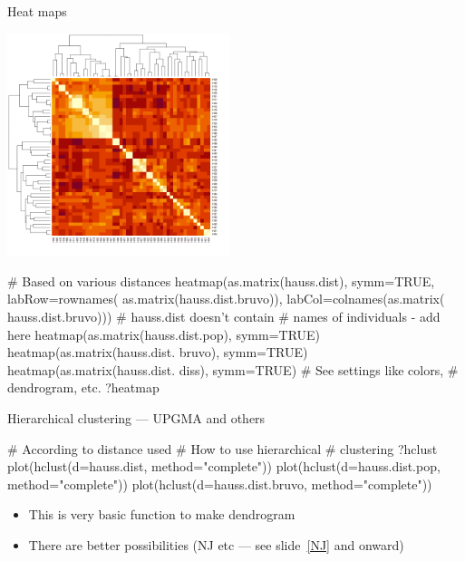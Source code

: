 \documentclass[compress, xelatex, 11pt, xcolor=svgnames, aspectratio=169,
	hyperref={
		bookmarks=true,
		unicode=true,
		colorlinks=true,
		pdftitle={Molecular data in R},
		plainpages=false,
		pdfauthor={Vojtech Zeisek},
		pdfsubject={Course about phylogeny and evolution in R},
		pdfcreator={XeLaTeX},
		pdfkeywords={R, evolution, phylogeny, molecular data},
		linkcolor=Crimson, %
		anchorcolor=Magenta, %
		citecolor=Magenta, %
		filecolor=Magenta, %
		menucolor=Magenta, %
		urlcolor=DodgerBlue, %
		},
	url={hyphens, lowtilde} %
	]{beamer}
\renewcommand{\texttt}[1]{\colorbox{Beige}{{\ttfamily #1}}}
\begin{document}
\begin{frame}[fragile]{Heat maps}
	\label{hierclust}
	\begin{multicols}{2}
		\includegraphics[height=6.5cm]{heatmap.png}
		\columnbreak
		\begin{spluscode}
    # Based on various distances
    heatmap(as.matrix(hauss.dist),
      symm=TRUE, labRow=rownames(
      as.matrix(hauss.dist.bruvo)),
      labCol=colnames(as.matrix(
      hauss.dist.bruvo)))
      # hauss.dist doesn't contain
      # names of individuals - add here
    heatmap(as.matrix(hauss.dist.pop),
      symm=TRUE)
    heatmap(as.matrix(hauss.dist.
      bruvo), symm=TRUE)
    heatmap(as.matrix(hauss.dist.
      diss), symm=TRUE)
    # See settings like colors,
    # dendrogram, etc.
    ?heatmap
		\end{spluscode}
	\end{multicols}
\end{frame}

\begin{frame}[fragile]{Hierarchical clustering --- UPGMA and others}
	\begin{multicols}{2}
		\texttt{[image: hierclust.png]}
		\begin{spluscode}
    # According to distance used
    # How to use hierarchical
    # clustering
    ?hclust
    plot(hclust(d=hauss.dist,
      method="complete"))
    plot(hclust(d=hauss.dist.pop,
      method="complete"))
    plot(hclust(d=hauss.dist.bruvo,
      method="complete"))
		\end{spluscode}
		\vfil
		\begin{itemize}
			\item This is very basic function to make dendrogram
			\item There are better possibilities (NJ etc --- see slide~\ref{NJ} and onward)
		\end{itemize}
	\end{multicols}
	\vfill
\end{frame}
\end{document}

